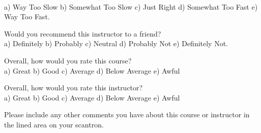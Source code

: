 \documentclass[10pt]{examdesign}
\begin{document}
\begin{multiplechoice} [title={Survey Questions (1 Point Each)},
	rearrange=no]
\begin{question}
\\a) Way Too Slow	b) Somewhat Too Slow	c) Just Right	d) Somewhat Too Fast	e) Way Too Fast.
\end{question}
\begin{question}
Would you recommend this instructor to a friend? 
\\a) Definitely	b) Probably	c) Neutral	d) Probably Not	e) Definitely Not.
\end{question}
\begin{question}
Overall, how would you rate this course? 
\\a) Great		b) Good		c) Average	d) Below Average	e) Awful
\end{question}
\begin{question}
Overall, how would you rate this instructor?
\\a) Great		b) Good		c) Average	d) Below Average	e) Awful
\end{question}

\begin{question}
Please include any other comments you have about this course or instructor in the lined area on your scantron.
\end{question}

\end{multiplechoice}
\end{document}
